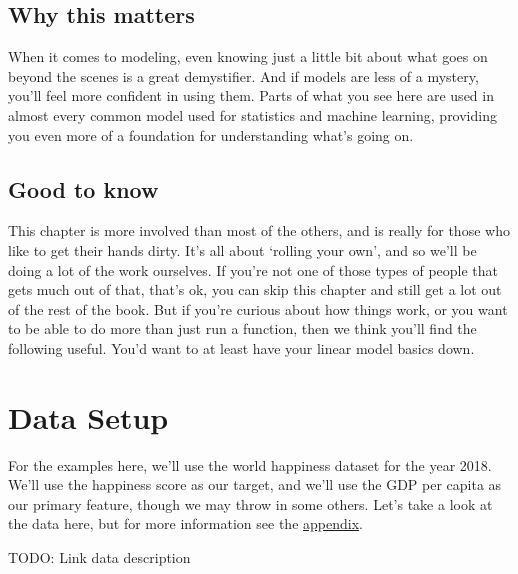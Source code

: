 \documentclass[
  letterpaper,
]{krantz}
\begin{document}
\subsection{Why this matters}\label{sec-estim-why}

When it comes to modeling, even knowing just a little bit about what
goes on beyond the scenes is a great demystifier. And if models are less
of a mystery, you'll feel more confident in using them. Parts of what
you see here are used in almost every common model used for statistics
and machine learning, providing you even more of a foundation for
understanding what's going on.

\subsection{Good to know}\label{sec-estim-good-to-know}

This chapter is more involved than most of the others, and is really for
those who like to get their hands dirty. It's all about `rolling your
own', and so we'll be doing a lot of the work ourselves. If you're not
one of those types of people that gets much out of that, that's ok, you
can skip this chapter and still get a lot out of the rest of the book.
But if you're curious about how things work, or you want to be able to
do more than just run a function, then we think you'll find the
following useful. You'd want to at least have your linear model basics
down.

\section{Data Setup}\label{sec-estim-data-setup}

For the examples here, we'll use the world happiness dataset for the
year 2018. We'll use the happiness score as our target, and we'll use
the GDP per capita as our primary feature, though we may throw in some
others. Let's take a look at the data here, but for more information see
the \hyperref[appendix]{appendix}.

TODO: Link data description
\end{document}
